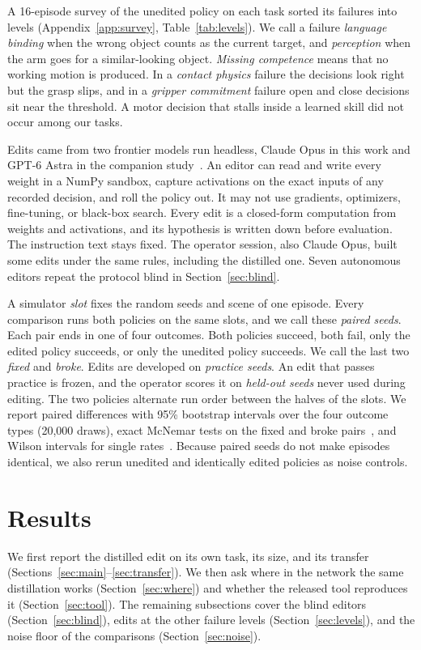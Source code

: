 \documentclass{article}
\begin{document}
A 16-episode survey of the unedited policy on each task sorted its failures into levels (Appendix~\ref{app:survey}, Table~\ref{tab:levels}). We call a failure \emph{language binding} when the wrong object counts as the current target, and \emph{perception} when the arm goes for a similar-looking object. \emph{Missing competence} means that no working motion is produced. In a \emph{contact physics} failure the decisions look right but the grasp slips, and in a \emph{gripper commitment} failure open and close decisions sit near the threshold. A motor decision that stalls inside a learned skill did not occur among our tasks.

Edits came from two frontier models run headless, Claude Opus in this work and GPT-6 Astra in the companion study~\citep{abbas2026wspstudy}. An editor can read and write every weight in a NumPy sandbox, capture activations on the exact inputs of any recorded decision, and roll the policy out. It may not use gradients, optimizers, fine-tuning, or black-box search. Every edit is a closed-form computation from weights and activations, and its hypothesis is written down before evaluation. The instruction text stays fixed. The operator session, also Claude Opus, built some edits under the same rules, including the distilled one. Seven autonomous editors repeat the protocol blind in Section~\ref{sec:blind}.

A simulator \emph{slot} fixes the random seeds and scene of one episode. Every comparison runs both policies on the same slots, and we call these \emph{paired seeds}. Each pair ends in one of four outcomes. Both policies succeed, both fail, only the edited policy succeeds, or only the unedited policy succeeds. We call the last two \emph{fixed} and \emph{broke}. Edits are developed on \emph{practice seeds}. An edit that passes practice is frozen, and the operator scores it on \emph{held-out seeds} never used during editing. The two policies alternate run order between the halves of the slots. We report paired differences with 95\% bootstrap intervals over the four outcome types (20,000 draws), exact McNemar tests on the fixed and broke pairs~\citep{mcnemar1947note}, and Wilson intervals for single rates~\citep{wilson1927probable}. Because paired seeds do not make episodes identical, we also rerun unedited and identically edited policies as noise controls.

\section{Results}
\label{sec:results}
We first report the distilled edit on its own task, its size, and its transfer (Sections~\ref{sec:main}--\ref{sec:transfer}). We then ask where in the network the same distillation works (Section~\ref{sec:where}) and whether the released tool reproduces it (Section~\ref{sec:tool}). The remaining subsections cover the blind editors (Section~\ref{sec:blind}), edits at the other failure levels (Section~\ref{sec:levels}), and the noise floor of the comparisons (Section~\ref{sec:noise}).
\end{document}

